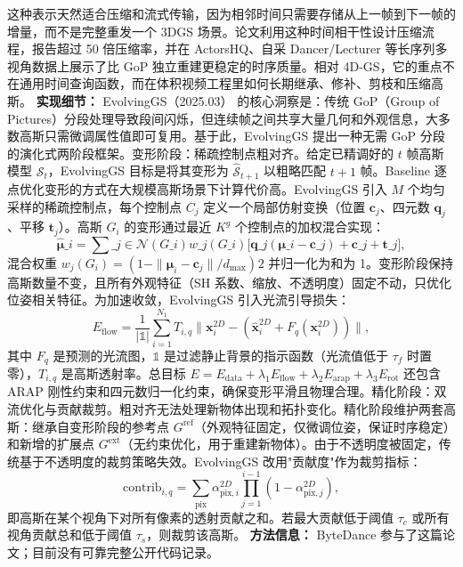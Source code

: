 这种表示天然适合压缩和流式传输，因为相邻时间只需要存储从上一帧到下一帧的增量，而不是完整重发一个 3DGS 场景。论文利用这种时间相干性设计压缩流程，报告超过 50 倍压缩率，并在 ActorsHQ、自采 Dancer/Lecturer 等长序列多视角数据上展示了比 GoP 独立重建更稳定的时序质量。相对 4D-GS，它的重点不在通用时间查询函数，而在体积视频工程里如何长期继承、修补、剪枝和压缩高斯。
\textbf{实现细节：} EvolvingGS（2025.03） 的核心洞察是：传统 GoP（Group of Pictures）分段处理导致段间闪烁，但连续帧之间共享大量几何和外观信息，大多数高斯只需微调属性值即可复用。基于此，EvolvingGS 提出一种无需 GoP 分段的演化式两阶段框架。变形阶段：稀疏控制点粗对齐。给定已精调好的 $t$ 帧高斯模型 $\mathcal{S}_t$，EvolvingGS 目标是将其变形为 $\hat{\mathcal{S}}_{t+1}$ 以粗略匹配 $t+1$ 帧。Baseline 逐点优化变形的方式在大规模高斯场景下计算代价高。EvolvingGS 引入 $M$ 个均匀采样的稀疏控制点，每个控制点 $C_j$ 定义一个局部仿射变换（位置 $\mathbf{c}_j$、四元数 $\mathbf{q}_j$、平移 $\mathbf{t}_j$）。高斯 $G_i$ 的变形通过最近 $K^g$ 个控制点的加权混合实现： $$\hat{\boldsymbol{\mu}}\_i=\sum\_{j\in\mathcal{N}(G\_i)}w\_j(G\_i)\bigl[\mathbf{q}\_j(\boldsymbol{\mu}\_i-\mathbf{c}\_j)+\mathbf{c}\_j+\mathbf{t}\_j\bigr],$$ 混合权重 $w_j(G_i)=(1-\|\boldsymbol{\mu}_i-\mathbf{c}_j\|/d_{\max})^{}2$ 并归一化为和为 1。变形阶段保持高斯数量不变，且所有外观特征（SH 系数、缩放、不透明度）固定不动，只优化位姿相关特征。为加速收敛，EvolvingGS 引入光流引导损失： $$E_{\text{flow}}=\frac{1}{|\mathbb{1}|}\sum_{i=1}^{N_1}T_{i,q}\|\mathbf{x}_i^{2D}-(\hat{\mathbf{x}}_i^{2D}+F_q(\mathbf{x}_i^{2D}))\|,$$ 其中 $F_q$ 是预测的光流图，$\mathbb{1}$ 是过滤静止背景的指示函数（光流值低于 $\tau_f$ 时置零），$T_{i,q}$ 是高斯透射率。总目标 $E=E_{\mathrm{data}}+\lambda_1 E_{\mathrm{flow}}+\lambda_2 E_{\mathrm{arap}}+\lambda_3 E_{\mathrm{rot}}$ 还包含 ARAP 刚性约束和四元数归一化约束，确保变形平滑且物理合理。精化阶段：双流优化与贡献裁剪。粗对齐无法处理新物体出现和拓扑变化。精化阶段维护两套高斯：继承自变形阶段的参考点 $G^{\mathrm{ref}}$（外观特征固定，仅微调位姿，保证时序稳定）和新增的扩展点 $G^{\mathrm{ext}}$（无约束优化，用于重建新物体）。由于不透明度被固定，传统基于不透明度的裁剪策略失效。EvolvingGS 改用"贡献度"作为裁剪指标： $$\text{contrib}_{i,q}=\sum_{\text{pix}}\alpha_{\text{pix},i}^{2D}\prod_{j=1}^{i-1}(1-\alpha_{\text{pix},j}^{2D}),$$ 即高斯在某个视角下对所有像素的透射贡献之和。若最大贡献低于阈值 $\tau_c$ 或所有视角贡献总和低于阈值 $\tau_s$，则裁剪该高斯。
\textbf{方法信息：} ByteDance 参与了这篇论文；目前没有可靠完整公开代码记录。
